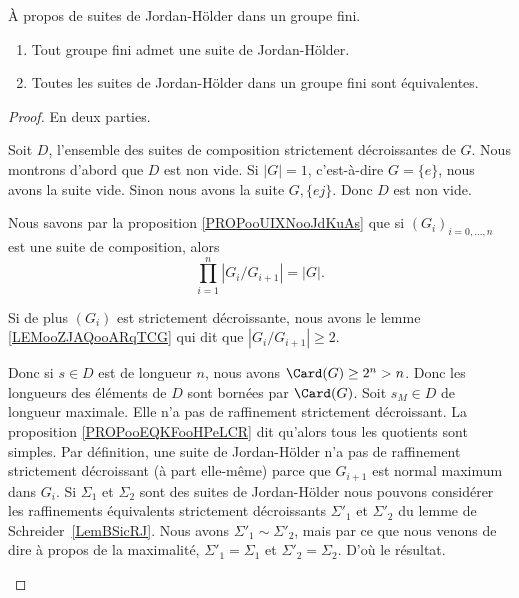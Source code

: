 \begin{theorem}\label{ThoLgxWIC}
	À propos de suites de Jordan-Hölder dans un groupe fini.
	\begin{enumerate}
		\item       \label{ITEMooRSDDooNHkFYO}
		      Tout groupe fini admet une suite de Jordan-Hölder.
		\item       \label{ITEMooGBOCooBAgnyt}
		      Toutes les suites de Jordan-Hölder dans un groupe fini sont équivalentes.
	\end{enumerate}
\end{theorem}

\begin{proof}
	En deux parties.
	\begin{subproof}
		Soit \( D\), l'ensemble des suites de composition strictement décroissantes de \( G\). Nous montrons d'abord que \( D\) est non vide. Si \( | G |=1\), c'est-à-dire \( G=\{ e \}\), nous avons la suite vide. Sinon nous avons la suite \( G,\{ ej \}\). Donc \( D\) est non vide.

		Nous savons par la proposition \ref{PROPooUIXNooJdKuAs} que si \( (G_i)_{i=0,\ldots,n}\) est une suite de composition, alors
		\begin{equation}
			\prod_{i=1}^n| G_i/G_{i+1} |=| G |.
		\end{equation}

		Si de plus \( (G_i)\) est strictement décroissante, nous avons le lemme \ref{LEMooZJAQooARqTCG} qui dit que \( | G_i/G_{i+1} |\geq 2\).

		Donc si \( s\in D\) est de longueur \( n\), nous avons \( \Card(G)\geq 2^n>n\). Donc les longueurs des éléments de \( D\) sont bornées par \( \Card(G)\). Soit \( s_M\in D\) de longueur maximale. Elle n'a pas de raffinement strictement décroissant. La proposition \ref{PROPooEQKFooHPeLCR} dit qu'alors tous les quotients sont simples.
		Par définition, une suite de Jordan-Hölder n'a pas de raffinement strictement décroissant (à part elle-même) parce que \( G_{i+1}\) est normal maximum dans \( G_i\). Si \( \Sigma_1\) et \( \Sigma_2\) sont des suites de Jordan-Hölder nous pouvons considérer les raffinements équivalents strictement décroissants \( \Sigma'_1\) et \( \Sigma'_2\) du lemme de Schreider~\ref{LemBSicRJ}. Nous avons \( \Sigma'_1\sim\Sigma'_2\), mais par ce que nous venons de dire à propos de la maximalité, \( \Sigma'_1=\Sigma_1\) et \( \Sigma'_2=\Sigma_2\). D'où le résultat.
	\end{subproof}
\end{proof}

